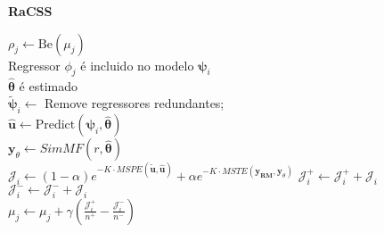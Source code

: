 \documentclass[12pt,a4paper,titlepage,final]{book}
\theoremstyle{definition}
\begin{document}
%

\begin{algorithm}[htpb]
  \caption{\bf{RaCSS}}\label{alg:RaMSS}
  {
     {
        {
           $\rho_j \gets \text{Be}(\mu_j)$ \\
           {
              Regressor $\phi_j$ é incluido no modelo $\bm{\psi}_i$\\
           }
        }
        $\hat{\bm{\theta}}$ é estimado \\
        $\tilde{\bm{\psi}}_i \gets $ Remove regressores redundantes; \\
        $\hat{\bm{u}} \gets \text{Predict}(\bm{\psi}_i,\hat{\bm{\theta}})$ \\
        $\bm{y}_{\theta} \gets SimMF(r,\hat{\bm{\theta}})$ \\
        $\mathcal{J}_i \gets (1-\alpha)e^{-K\cdot MSPE(\tilde{\bm{u}},\bm{\hat{u}})} + \alpha e^{-K\cdot MSTE(\bm{y_{RM}},\bm{y}_\theta)} $
     }
     {
        {
           {
              $\mathcal{J}_i^{+} \gets \mathcal{J}_i^{+} + \mathcal{J}_i$ \\
           } \Else
           {
              $\mathcal{J}_i^{-} \gets \mathcal{J}_i^{-} + \mathcal{J}_i$ \\
           }
        }
        $\mu_j \gets \mu_j + \gamma  \left( \frac{\mathcal{J}_i^{+}}{n^+} - \frac{\mathcal{J}_i^{-}}{n^-} \right) $ \\
     }
  }
\end{algorithm}%

\end{document}
